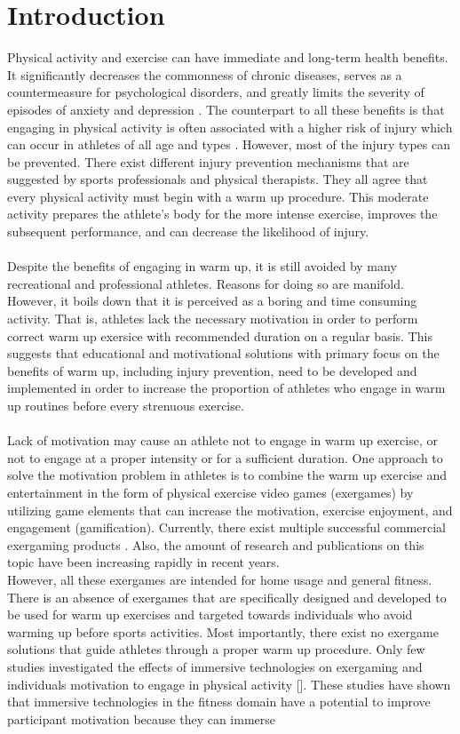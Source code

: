 \chapter{Introduction}
\label{chap:intro}
Physical activity and exercise can have immediate and long-term health benefits. It significantly decreases the commonness of chronic diseases, serves as a countermeasure for psychological disorders, and greatly limits the severity of episodes of anxiety and depression \cite{mayr2015prevention, warburton2006health}. The counterpart to all these benefits is that engaging in physical activity is often associated with a higher risk of injury which can occur in athletes of all age and types \cite{van1997severity}. However, most of the injury types can be prevented. There exist different injury prevention mechanisms that are suggested by sports professionals and physical therapists. They all agree that every physical activity must begin with a warm up procedure.  This moderate activity prepares the athlete's body for the more intense exercise, improves the subsequent performance, and can decrease the likelihood of injury. \\\\Despite the benefits of engaging in warm up, it is still avoided by many recreational and professional athletes. Reasons for doing so are manifold. However, it boils down that it is perceived as a boring and time consuming activity. That is, athletes lack the necessary motivation in order to  perform correct warm up exersice with recommended duration on a regular basis. This suggests that educational and motivational solutions with primary focus on the benefits of warm up, including injury prevention, need to be developed and implemented in order to increase the proportion of athletes who engage in warm up routines before every strenuous exercise.\\\\  Lack of motivation may cause an athlete not to engage in warm up exercise, or not to engage at a proper intensity or for a sufficient duration. One approach to solve the motivation problem in athletes is to combine the warm up exercise and entertainment in the form of physical exercise video games (exergames) by utilizing game elements that can increase the motivation, exercise enjoyment, and engagement (gamification). Currently, there exist multiple successful commercial exergaming products \cite{wii, dance}. Also, the amount of research and publications on this topic have  been increasing rapidly in recent years.\\ However, all these exergames are intended for home usage and general fitness. There is an absence of exergames that are specifically designed and developed to be used for warm up exercises and targeted towards individuals who avoid warming up before sports activities. Most importantly, there exist no exergame solutions that guide athletes through a proper warm up procedure.  Only few studies investigated the effects of immersive technologies on exergaming and individuals motivation to engage in physical activity []. These studies have shown that immersive technologies in the fitness domain have a potential to improve participant motivation because they can immerse 